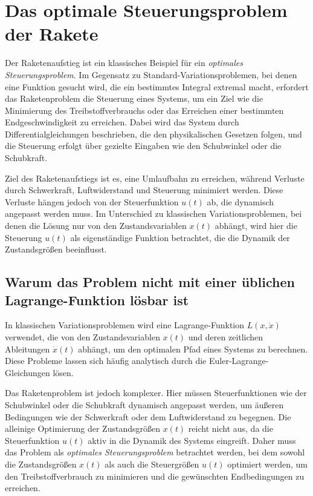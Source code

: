 %
%
%
%

\section{Das optimale Steuerungsproblem der Rakete \label{leo:section:optimalsteuerung}}

Der Raketenaufstieg ist ein klassisches Beispiel für ein \textit{optimales Steuerungsproblem}. Im Gegensatz zu Standard-Variationsproblemen, bei denen eine Funktion gesucht wird, die ein bestimmtes Integral extremal macht, erfordert das Raketenproblem die Steuerung eines Systems, um ein Ziel wie die Minimierung des Treibstoffverbrauchs oder das Erreichen einer bestimmten Endgeschwindigkeit zu erreichen. Dabei wird das System durch Differentialgleichungen beschrieben, die den physikalischen Gesetzen folgen, und die Steuerung erfolgt über gezielte Eingaben wie den Schubwinkel oder die Schubkraft.

Ziel des Raketenaufstiegs ist es, eine Umlaufbahn zu erreichen, während Verluste durch Schwerkraft, Luftwiderstand und Steuerung minimiert werden. Diese Verluste hängen jedoch von der Steuerfunktion \( u(t) \) ab, die dynamisch angepasst werden muss. Im Unterschied zu klassischen Variationsproblemen, bei denen die Lösung nur von den Zustandsvariablen \( x(t) \) abhängt, wird hier die Steuerung \( u(t) \) als eigenständige Funktion betrachtet, die die Dynamik der Zustandsgrößen beeinflusst.

\subsection{Warum das Problem nicht mit einer üblichen Lagrange-Funktion lösbar ist}

In klassischen Variationsproblemen wird eine Lagrange-Funktion \(L(x, \dot{x})\) verwendet, die von den Zustandsvariablen \(x(t)\) und deren zeitlichen Ableitungen \(\dot{x}(t)\) abhängt, um den optimalen Pfad eines Systems zu berechnen. Diese Probleme lassen sich häufig analytisch durch die Euler-Lagrange-Gleichungen lösen.

Das Raketenproblem ist jedoch komplexer. Hier müssen Steuerfunktionen wie der Schubwinkel oder die Schubkraft dynamisch angepasst werden, um äußeren Bedingungen wie der Schwerkraft oder dem Luftwiderstand zu begegnen. Die alleinige Optimierung der Zustandsgrößen \(x(t)\) reicht nicht aus, da die Steuerfunktion \(u(t)\) aktiv in die Dynamik des Systems eingreift. Daher muss das Problem als \textit{optimales Steuerungsproblem} betrachtet werden, bei dem sowohl die Zustandsgrößen \(x(t)\) als auch die Steuergrößen \(u(t)\) optimiert werden, um den Treibstoffverbrauch zu minimieren und die gewünschten Endbedingungen zu erreichen.

